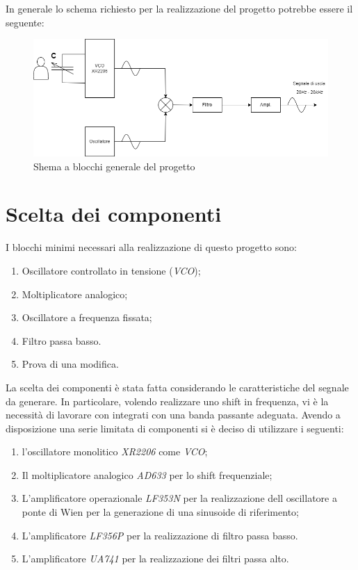 \documentclass[titlepage]{report}
\begin{document}
	 In generale lo schema richiesto per la realizzazione del progetto potrebbe essere il seguente:
	 
	\begin{figure}[htbp]
		\centering
		\includegraphics[scale=0.5]{Immagini/Schema Generale PSEA.png}
		\caption{Shema a blocchi generale del progetto}
		\label{fig: schema a blocchi generico}
	\end{figure}	


\newpage

	
\chapter{Scelta dei componenti}
	\label{ch:Scelta_componenti}
	I blocchi minimi necessari alla realizzazione di questo progetto sono:
	
	\begin{enumerate}
		\item Oscillatore controllato in tensione (\textit{VCO});
		\item Moltiplicatore analogico;
		\item Oscillatore a frequenza fissata;
		\item Filtro passa basso.
		\item Prova di una modifica.
	\end{enumerate}
	
	\noindent La scelta dei componenti è stata fatta considerando le caratteristiche del segnale da generare. In particolare, volendo realizzare uno shift in frequenza, vi è la necessità di lavorare con integrati con una banda passante adeguata.
	Avendo a disposizione una serie limitata di componenti si è deciso di utilizzare i seguenti:
	
	\begin{enumerate}
		\item l'oscillatore monolitico \textit{XR2206} come \textit{VCO};
		\item Il moltiplicatore analogico \textit{AD633} per lo shift frequenziale;
		\item L'amplificatore operazionale \textit{LF353N} per la realizzazione dell oscillatore a ponte di Wien per la generazione di una sinusoide di riferimento;
		\item L'amplificatore \textit{LF356P} per la realizzazione di filtro passa basso.
		\item L'amplificatore \textit{UA741} per la realizzazione dei filtri passa alto.
	\end{enumerate}
	
\end{document}
